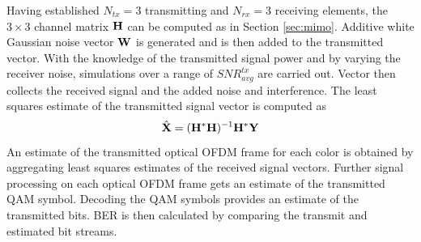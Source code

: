 Having established $N_{tx} = 3$ transmitting and $N_{rx} = 3$ receiving elements, the $3\times 3$ channel matrix ${\bf{H}}$ can be computed as in Section \ref{sec:mimo}. Additive white Gaussian noise vector ${\bf{W}}$ is generated and is then added to the transmitted vector. With the knowledge of the transmitted signal power and by varying the receiver noise, simulations over a range of $SNR_{avg}^{tx}$ are carried out. Vector  then collects the received signal and the added noise and interference. The least squares estimate of the transmitted signal vector is computed as
\begin{equation}
	\label{eqXhat}
	\hat{\vm{X}} = (\vm{H}^{*}\vm{H})^{-1}\vm{H}^{*}\vm{Y}
\end{equation}
An estimate of the transmitted optical OFDM frame for each color is obtained by aggregating least squares estimates of the received signal vectors. Further signal processing on each optical OFDM frame gets an estimate of the transmitted QAM symbol. Decoding the QAM symbols provides an estimate of the transmitted bits. BER is then calculated by comparing the transmit and estimated bit streams.

